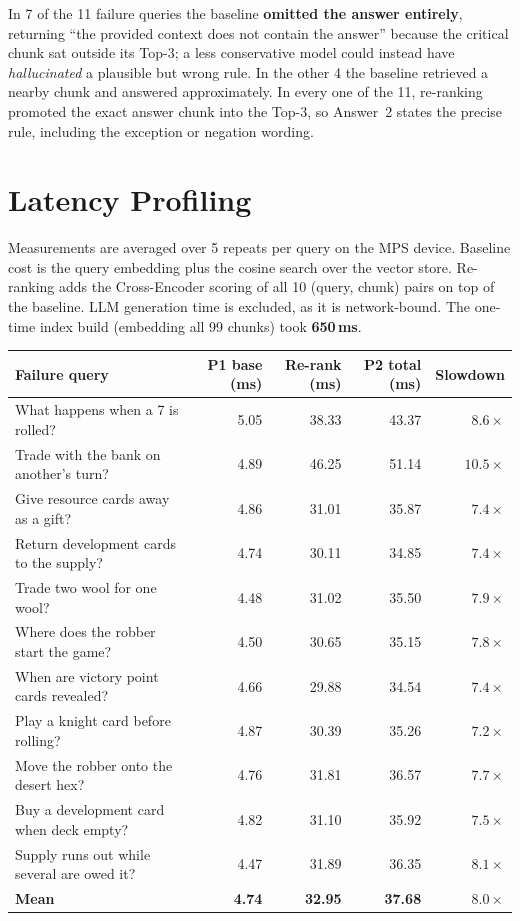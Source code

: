 \documentclass[11pt]{article}
\begin{document}
\noindent In 7 of the 11 failure queries the baseline \textbf{omitted the answer entirely},
returning ``the provided context does not contain the answer'' because the critical chunk sat outside
its Top-3; a less conservative model could instead have \emph{hallucinated} a plausible but wrong
rule. In the other 4 the baseline retrieved a nearby chunk and answered approximately. In every one
of the 11, re-ranking promoted the exact answer chunk into the Top-3, so Answer~2 states the precise
rule, including the exception or negation wording.

\section{Latency Profiling}
Measurements are averaged over 5 repeats per query on the MPS device. Baseline cost is the query
embedding plus the cosine search over the vector store. Re-ranking adds the Cross-Encoder scoring of
all 10 (query, chunk) pairs on top of the baseline. LLM generation time is excluded, as it is
network-bound. The one-time index build (embedding all 99 chunks) took \textbf{650\,ms}.

\begin{center}
\footnotesize
\begin{tabular}{@{}L{5.9cm} r r r r@{}}
\toprule
\textbf{Failure query} & \textbf{P1 base (ms)} & \textbf{Re-rank (ms)} & \textbf{P2 total (ms)} & \textbf{Slowdown} \\
\midrule
What happens when a 7 is rolled? & 5.05 & 38.33 & 43.37 & $8.6\times$ \\
Trade with the bank on another's turn? & 4.89 & 46.25 & 51.14 & $10.5\times$ \\
Give resource cards away as a gift? & 4.86 & 31.01 & 35.87 & $7.4\times$ \\
Return development cards to the supply? & 4.74 & 30.11 & 34.85 & $7.4\times$ \\
Trade two wool for one wool? & 4.48 & 31.02 & 35.50 & $7.9\times$ \\
Where does the robber start the game? & 4.50 & 30.65 & 35.15 & $7.8\times$ \\
When are victory point cards revealed? & 4.66 & 29.88 & 34.54 & $7.4\times$ \\
Play a knight card before rolling? & 4.87 & 30.39 & 35.26 & $7.2\times$ \\
Move the robber onto the desert hex? & 4.76 & 31.81 & 36.57 & $7.7\times$ \\
Buy a development card when deck empty? & 4.82 & 31.10 & 35.92 & $7.5\times$ \\
Supply runs out while several are owed it? & 4.47 & 31.89 & 36.35 & $8.1\times$ \\
\midrule
\textbf{Mean} & \textbf{4.74} & \textbf{32.95} & \textbf{37.68} & \textbf{$8.0\times$} \\
\bottomrule
\end{tabular}
\end{center}
\end{document}
